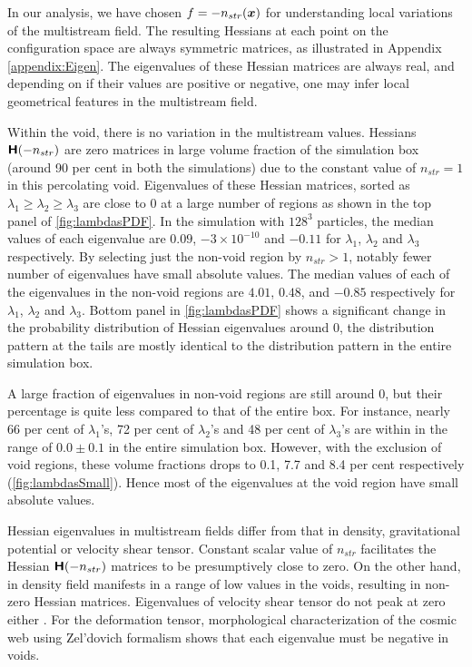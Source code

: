 \documentclass[fleqn,usenatbib,useAMS]{mnras}
\begin{document}
In our analysis, we have chosen $f = -n_{str}(\bmath{x})$ for understanding local variations of the multistream field. The resulting Hessians at each point on the configuration space are always symmetric matrices, as illustrated in Appendix \ref{appendix:Eigen}. The eigenvalues of these Hessian matrices are always real, and depending on if their values are positive or negative, one may infer local geometrical features in the multistream field. 

Within the void, there is no variation in the multistream values. Hessians $\textbf{\textsf{H}}(-n_{str})$ are zero matrices in large volume fraction of the simulation box (around 90 per cent in both the simulations) due to the constant value of $n_{str} = 1$ in this percolating void. Eigenvalues of these Hessian matrices, sorted as $ \lambda_1 \geq \lambda_2 \geq \lambda_3 $ are close to 0 at a large number of regions as shown in the top panel of \autoref{fig:lambdasPDF}. In the simulation with $128^3$ particles, the median values of each eigenvalue are $0.09$, $-3\times 10^{-10}$ and $-0.11$ for  $\lambda_1$, $\lambda_2$ and $\lambda_3$ respectively. By selecting just the non-void region by $n_{str} > 1$, notably fewer number of eigenvalues have small absolute values. The median values of each of the eigenvalues in the non-void regions are $4.01$, $0.48$, and $-0.85$ respectively for $\lambda_1$, $\lambda_2$ and  $\lambda_3$. Bottom panel in \autoref{fig:lambdasPDF} shows a significant change in the probability distribution of Hessian eigenvalues around 0, the distribution pattern at the tails are mostly identical to the distribution pattern in the entire simulation box. 


A large fraction of eigenvalues in non-void regions are still around 0, but their percentage is quite less compared to that of the entire box. For instance, nearly 66 per cent of $\lambda_1$'s, 72 per cent of $\lambda_2$'s and 48 per cent of $\lambda_3$'s are  within in the range of $0.0 \pm 0.1$ in the entire simulation box. However, with the exclusion of void regions, these volume fractions drops to 0.1, 7.7 and 8.4 per cent respectively (\autoref{fig:lambdasSmall}). Hence most of the eigenvalues at the void region have small absolute values.

Hessian eigenvalues in multistream fields differ from that in density, gravitational potential or velocity shear tensor. Constant scalar value of $n_{str}$ facilitates the Hessian $\textbf{\textsf{H}}(-n_{str})$ matrices to be presumptively close to zero. On the other hand, in density field manifests in a range of low values in the voids, resulting in non-zero Hessian matrices. Eigenvalues of velocity shear tensor do not peak at zero either \cite{Libeskind2013}. For the deformation tensor, morphological characterization of the cosmic web using Zel'dovich formalism shows that each eigenvalue must be negative in voids. 
\end{document}
